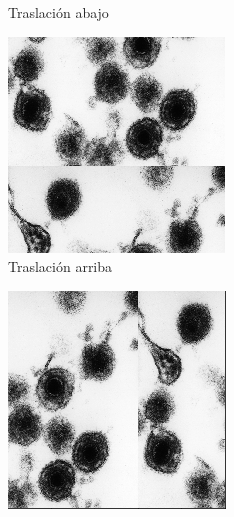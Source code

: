 \documentclass{uc3mpracticas}
\begin{document}
\begin{figure}[!h]
\begin{subfigure}[b]{0.18\textwidth}
      \caption{Traslación abajo}
    \end{subfigure}
    \hfill
    \begin{subfigure}[b]{0.18\textwidth}
      \includegraphics[width=\textwidth, frame]{Images/trasArr.png}
      \caption{Traslación arriba}
    \end{subfigure}
    \hfill
    \begin{subfigure}[b]{0.18\textwidth}
      \includegraphics[width=\textwidth, frame]{Images/trasIzq.png}

\end{subfigure}
\end{figure}
\end{document}
